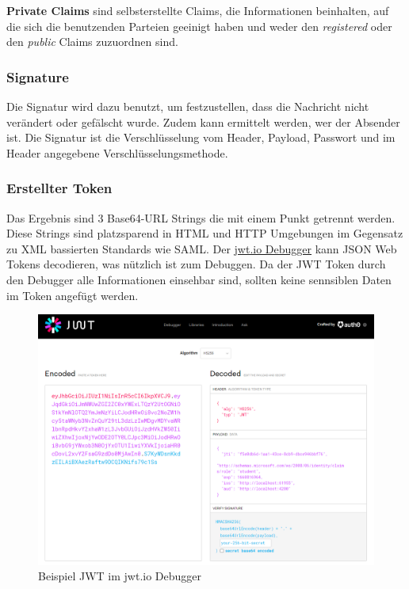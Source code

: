 \textbf{Private Claims} sind selbsterstellte Claims, die Informationen beinhalten, auf die sich die benutzenden Parteien geeinigt haben und weder den \textit{registered} 
oder den \textit{public} Claims zuzuordnen sind.

\subsubsection{Signature}
Die Signatur wird dazu benutzt, um festzustellen, dass die Nachricht nicht verändert oder gefälscht wurde. Zudem kann ermittelt werden, wer der Absender ist. 
Die Signatur ist die Verschlüsselung vom Header, Payload, Passwort und im Header angegebene Verschlüsselungsmethode.

\subsubsection{Erstellter Token}
Das Ergebnis sind 3 Base64-URL Strings die mit einem Punkt getrennt werden. Diese Strings sind platzsparend in HTML und HTTP Umgebungen im Gegensatz zu XML bassierten Standards wie SAML. 
Der \href{https://jwt.io/#debugger-io}{jwt.io Debugger} kann JSON Web Tokens decodieren, was nützlich ist zum Debuggen. Da der JWT Token durch den Debugger alle Informationen einsehbar sind, 
sollten keine sennsiblen Daten im Token angefügt werden.

\begin{figure}[h]
    \begin{center}
        \includegraphics*[width=15cm]{./pics/screenshot-JWT-token1.png}
        \caption[Bsp JWT in Debugger]{Beispiel JWT im jwt.io Debugger}
    \end{center}
\end{figure}

